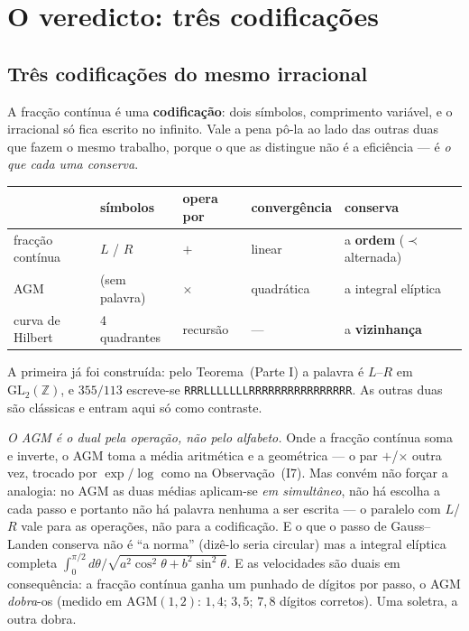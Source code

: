 \documentclass[11pt,a4paper]{article}
\theoremstyle{plain}
\theoremstyle{definition}
\theoremstyle{remark}
\newcommand{\Z}{\mathbb{Z}}
\newcommand{\GL}{\mathrm{GL}}
\begin{document}
\section{O veredicto: três codificações}\label{sec:vered}

\subsection{Três codificações do mesmo irracional}\label{sec:codificacoes}

A fracção contínua é uma \textbf{codificação}: dois símbolos, comprimento variável, e o irracional
só fica escrito no infinito. Vale a pena pô-la ao lado das outras duas que fazem o mesmo trabalho,
porque o que as distingue não é a eficiência --- é \emph{o que cada uma conserva}.

\begin{center}\small
\begin{tabular}{lllll}
\hline
 & símbolos & opera por & convergência & conserva \\ \hline
fracção contínua & $L$ / $R$ & $+$ & linear & a \textbf{ordem} ($\prec$ alternada) \\
AGM & (sem palavra) & $\times$ & quadrática & a integral elíptica \\
curva de Hilbert & 4 quadrantes & recursão & --- & a \textbf{vizinhança} \\
\hline
\end{tabular}
\end{center}

\noindent A primeira já foi construída: pelo Teorema~(Parte I) a palavra é $L$--$R$ em
$\GL_2(\Z)$, e $355/113$ escreve-se \texttt{RRRLLLLLLLRRRRRRRRRRRRRRRR}. As outras duas são
clássicas e entram aqui só como contraste.

\emph{O AGM é o dual pela operação, não pelo alfabeto.} Onde a fracção contínua soma e inverte, o
AGM toma a média aritmética e a geométrica --- o par $+$/$\times$ outra vez, trocado por
$\exp/\log$ como na Observação~(I7). Mas convém não forçar a analogia: no AGM as duas
médias aplicam-se \emph{em simultâneo}, não há escolha a cada passo e portanto não há palavra
nenhuma a ser escrita --- o paralelo com $L$/$R$ vale para as operações, não para a codificação. E
o que o passo de Gauss--Landen conserva não é ``a norma'' (dizê-lo seria circular) mas a integral
elíptica completa $\int_0^{\pi/2} d\theta/\sqrt{a^2\cos^2\theta+b^2\sin^2\theta}$. E as velocidades são duais em consequência: a fracção contínua ganha um
punhado de dígitos por passo, o AGM \emph{dobra}-os (medido em $\mathrm{AGM}(1,2)$: $1{,}4$;
$3{,}5$; $7{,}8$ dígitos corretos). Uma soletra, a outra dobra.
\end{document}
